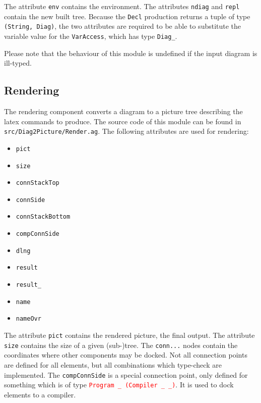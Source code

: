 \documentclass[12pt, a4paper, twoside]{article}
\newcommand{\red}[1]{\textcolor{red}{#1}}
\begin{document}
The attribute \texttt{env} contains the environment. The attributes \texttt{ndiag} and \texttt{repl} contain the new built tree.
Because the \texttt{Decl} production returns a tuple of type \texttt{(String, Diag)}, the two attributes are required
to be able to substitute the variable value for the \texttt{VarAccess}, which has type \texttt{Diag\_}.

Please note that the behaviour of this module is undefined if the input diagram is ill-typed.

\subsection{Rendering}
\label{sec:Inlining}
The rendering component converts a diagram to a picture tree describing the latex commands to produce. The source code
of this module can be found in \texttt{src/Diag2Picture/Render.ag}.
The following attributes are used for rendering:
\begin{itemize}
    \item \texttt{pict}
    \item \texttt{size}
    \item \texttt{connStackTop}
    \item \texttt{connSide}
    \item \texttt{connStackBottom}
    \item \texttt{compConnSide}
    \item \texttt{dlng}
    \item \texttt{result}
    \item \texttt{result\_}
    \item \texttt{name}
    \item \texttt{nameOvr}
\end{itemize}
The attribute \texttt{pict} contains the rendered picture, the final output. The attribute \texttt{size} contains
the size of a given (sub-)tree.
The \texttt{conn...} nodes contain the coordinates where other components may be docked. Not all connection points
are defined for all elements, but all combinations which type-check are implemented. The \texttt{compConnSide} is a
special connection point, only defined for something which is of type \red{\texttt{Program \_ (Compiler \_ \_)}}. It is used to dock
elements to a compiler.
\end{document}
